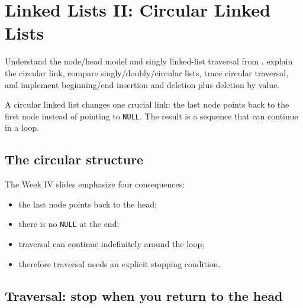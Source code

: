 \chapter{Linked Lists II: Circular Linked Lists}\label{ch:circular-list}

\chapterguide%
  {Understand the node/head model and singly linked-list traversal from .}
  {explain the circular link, compare singly/doubly/circular lists, trace circular traversal, and implement beginning/end insertion and deletion plus deletion by value.}

A circular linked list changes one crucial link: the last node points back to the first node instead of pointing to \texttt{NULL}. The result is a sequence that can continue in a loop.

\section{The circular structure}

\begin{mlfigure}
\end{mlfigure}

The Week IV slides emphasize four consequences:

\begin{itemize}
  \item the last node points back to the head;
  \item there is no \texttt{NULL} at the end;
  \item traversal can continue indefinitely around the loop;
  \item therefore traversal needs an explicit stopping condition.
\end{itemize}

\section{Traversal: stop when you return to the head}

